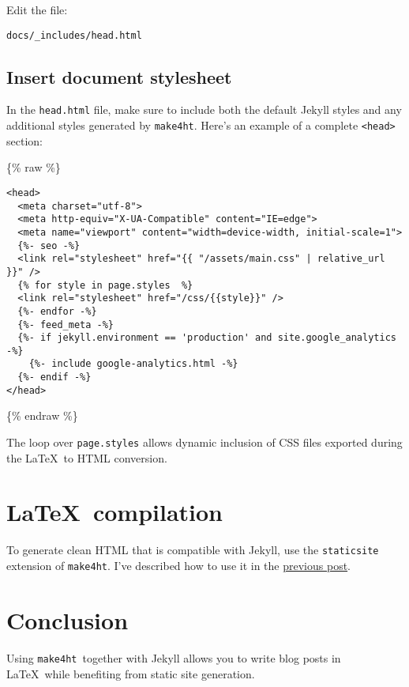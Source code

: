 \documentclass{article}
\def\makeht{\texttt{make4ht}}
\newcommand\liquidtag[1]{%
  \ifdefined\HCode\NoFonts\IgnorePar\EndP\HCode{\Hnewline}\{\% #1 \%\}\EndNoFonts\fi%
}
\begin{document}
Edit the file:

\begin{verbatim}
docs/_includes/head.html
\end{verbatim}

\subsection{Insert document stylesheet}

In the \texttt{head.html} file, make sure to include both the default Jekyll styles
and any additional styles generated by \makeht. Here's an example of a complete \texttt{<head>} section:

\liquidtag{raw}
\begin{verbatim}
<head>
  <meta charset="utf-8">
  <meta http-equiv="X-UA-Compatible" content="IE=edge">
  <meta name="viewport" content="width=device-width, initial-scale=1">
  {%- seo -%}
  <link rel="stylesheet" href="{{ "/assets/main.css" | relative_url }}" />
  {% for style in page.styles  %}
  <link rel="stylesheet" href="/css/{{style}}" />
  {%- endfor -%}
  {%- feed_meta -%}
  {%- if jekyll.environment == 'production' and site.google_analytics -%}
    {%- include google-analytics.html -%}
  {%- endif -%}
</head>
\end{verbatim}
\liquidtag{endraw}

The loop over \texttt{page.styles} allows dynamic inclusion of CSS files 
exported during the \LaTeX\ to HTML conversion.

\section{\LaTeX\ compilation}

To generate clean HTML that is compatible with Jekyll, 
use the \texttt{staticsite} extension of \makeht. I've described
how to use it in the \href{/testblog/2021/07/30/how-to-blog-with-tex4ht.html}{previous post}.


\section{Conclusion}

Using \makeht\ together with Jekyll allows you to write blog posts in \LaTeX\ 
while benefiting from static site generation. 
\end{document}
